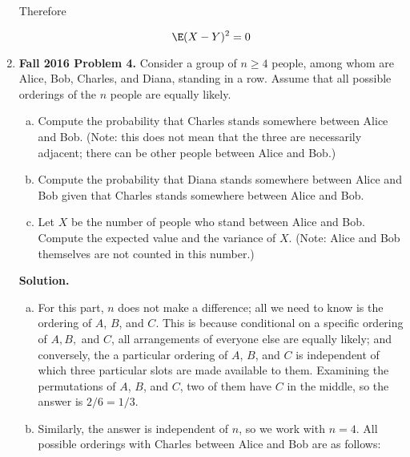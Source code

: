 \begin{enumerate}[(1)]
Therefore

\[
\E(X-Y)^2 =0
\]



\item \textbf{Fall 2016 Problem 4.} Consider a group of \(n \geq 4\) people, among whom are Alice, Bob, Charles, and Diana, standing in a row. Assume that all possible orderings of the \(n\) people are equally likely.

\begin{enumerate}[(a)]

\item Compute the probability that Charles stands somewhere between Alice and Bob. (Note: this does not mean that the three are necessarily adjacent; there can be other people between Alice and Bob.)

\item Compute the probability that Diana stands somewhere between Alice and Bob given that Charles stands somewhere between Alice and Bob.

\item Let \(X\) be the number of people who stand between Alice and Bob. Compute the expected value and the variance of \(X\). (Note: Alice and Bob themselves are not counted in this number.)

\end{enumerate}


\textbf{Solution.}

\begin{enumerate}[(a)]

\item For this part, \(n\) does not make a difference; all we need to know is the ordering of \(A\), \(B\), and \(C\). This is because conditional on a specific ordering of \(A, B,\) and \(C\), all arrangements of everyone else are equally likely; and conversely, the a particular ordering of \(A\), \(B\), and \(C\) is independent of which three particular slots are made available to them. Examining the permutations of \(A\), \(B\), and \(C\), two of them have \(C\) in the middle, so the answer is \(2/6 = \boxed{1/3}\).

\item Similarly, the answer is independent of \(n\), so we work with \(n=4\). All possible orderings with Charles between Alice and Bob are as follows:


\end{enumerate}
\end{enumerate}
